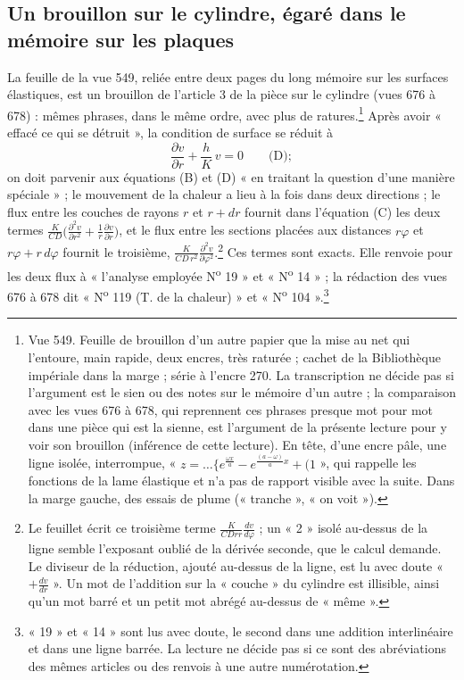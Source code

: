 \documentclass[11pt,a4paper]{article}
\begin{document}
\subsection*{Un brouillon sur le cylindre, égaré dans le mémoire sur les plaques}

La feuille de la vue 549, reliée entre deux pages du long mémoire sur les
surfaces élastiques, est un brouillon de l'article 3 de la pièce sur le
cylindre (vues 676 à 678) : mêmes phrases, dans le même ordre, avec plus de
ratures.\footnote{Vue 549. Feuille de brouillon d'un autre papier que la mise au
net qui l'entoure, main rapide, deux encres, très raturée ; cachet de la
Bibliothèque impériale dans la marge ; série à l'encre 270. La transcription
ne décide pas si l'argument est le sien ou des notes sur le mémoire d'un autre ;
la comparaison avec les vues 676 à 678, qui reprennent ces phrases presque mot
pour mot dans une pièce qui est la sienne, est l'argument de la présente
lecture pour y voir son brouillon (inférence de cette lecture). En tête, d'une
encre pâle, une ligne isolée, interrompue, « $z = \dots\{e^{\frac{\omega
x}{a}} - e^{\frac{(a-\omega)}{a}x} + (1$ », qui rappelle les fonctions de la
lame élastique et n'a pas de rapport visible avec la suite. Dans la marge
gauche, des essais de plume (« tranche », « on voit »).} Après avoir « effacé
ce qui se détruit », la condition de surface se réduit à
\[
\frac{\partial v}{\partial r} + \frac{h}{K}\,v = 0 \qquad \text{(D)} ;
\]
on doit parvenir aux équations (B) et (D) « en traitant la question d'une
manière spéciale » ; le mouvement de la chaleur a lieu à la fois dans deux
directions ; le flux entre les couches de rayons $r$ et $r + dr$ fournit dans
l'équation (C) les deux termes $\frac{K}{CD}\big(\frac{\partial^2 v}{\partial
r^2} + \frac1r \frac{\partial v}{\partial r}\big)$, et le flux entre les
sections placées aux distances $r\varphi$ et $r\varphi + r\,d\varphi$ fournit le
troisième, $\frac{K}{CD\,r^2}\frac{\partial^2 v}{\partial\varphi^2}$.\footnote{Le
feuillet écrit ce troisième terme $\frac{K}{CDrr}\frac{dv}{d\varphi}$ ; un « 2 »
isolé au-dessus de la ligne semble l'exposant oublié de la dérivée seconde,
que le calcul demande. Le diviseur de la réduction, ajouté au-dessus de la
ligne, est lu avec doute « $+\frac{dv}{dr}$ ». Un mot de l'addition sur la
« couche » du cylindre est illisible, ainsi qu'un mot barré et un petit mot
abrégé au-dessus de « même ».} Ces termes sont exacts. Elle renvoie pour les
deux flux à « l'analyse employée N\textsuperscript{o} 19 » et
« N\textsuperscript{o} 14 » ; la rédaction des vues 676 à 678 dit
« N\textsuperscript{o} 119 (T. de la chaleur) » et
« N\textsuperscript{o} 104 ».\footnote{« 19 » et « 14 » sont lus avec doute,
le second dans une addition interlinéaire et dans une ligne barrée. La
lecture ne décide pas si ce sont des abréviations des mêmes articles ou des
renvois à une autre numérotation.}
\end{document}
